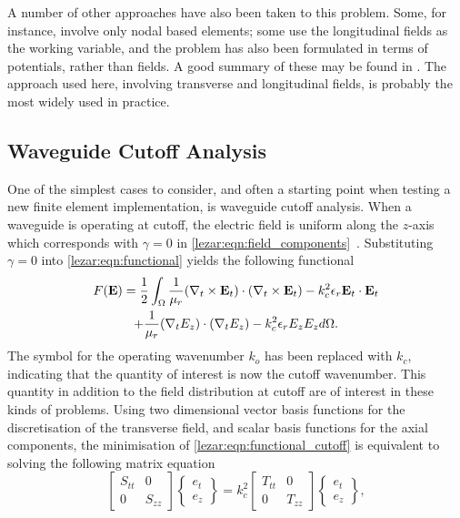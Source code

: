 A number of other approaches have also been taken to this
problem. Some, for instance, involve only nodal based elements; some
use the longitudinal fields as the working variable, and the problem
has also been formulated in terms of potentials, rather than fields. A
good summary of these may be found in \cite[Chapter 9]{ZhuCan2006}. The approach used here, involving transverse and
longitudinal fields, is probably the most widely used in practice.

\subsection{Waveguide Cutoff Analysis}
\label{lezar:sec:cutoff_formulation}
One of the simplest cases to consider, and often a starting point when
testing a new finite element implementation, is waveguide cutoff
analysis. When a waveguide is operating at cutoff, the electric field
is uniform along the $z$-axis which corresponds with $\gamma = 0$ in
\eqref{lezar:eqn:field_components}~\cite{Poz2005}.  Substituting $\gamma = 0$ into
\eqref{lezar:eqn:functional} yields the following functional
\begin{multline}
    \label{lezar:eqn:functional_cutoff}
    F(\mathbf{E}) = \frac{1}{2}\int_{\Omega}\frac{1}{\mu_r}(\curl{\mathbf{E}_t}{t})\cdot(\curl{\mathbf{E}_t}{t}) -k_c^2\epsilon_r\mathbf{E}_t\cdot{\mathbf{E}_t}\\
    +\frac{1}{\mu_r}(\nabla_t{E_z})\cdot(\nabla_t{E_z})
    -k_c^2\epsilon_r E_z{E_z} d\Omega.
\end{multline}
The symbol for the operating wavenumber
$k_o$ has been replaced with $k_c$, indicating that the
quantity of interest is now the cutoff
wavenumber. This quantity in addition to the
field distribution at cutoff are of interest in these kinds of
problems.  Using two dimensional vector basis functions for the
discretisation of the transverse field, and scalar basis functions for
the axial components, the minimisation of
\eqref{lezar:eqn:functional_cutoff} is equivalent to solving the following
matrix equation
\begin{equation}
    \label{lezar:eqn:matrix_equation_cutoff}
    \begin{bmatrix} S_{tt} & 0\\0 &
    S_{zz}\end{bmatrix}\begin{Bmatrix}e_t\\e_z\end{Bmatrix} =
    k_c^2\begin{bmatrix} T_{tt} & 0\\0 &
    T_{zz}\end{bmatrix}\begin{Bmatrix}e_t\\e_z\end{Bmatrix},
\end{equation}
